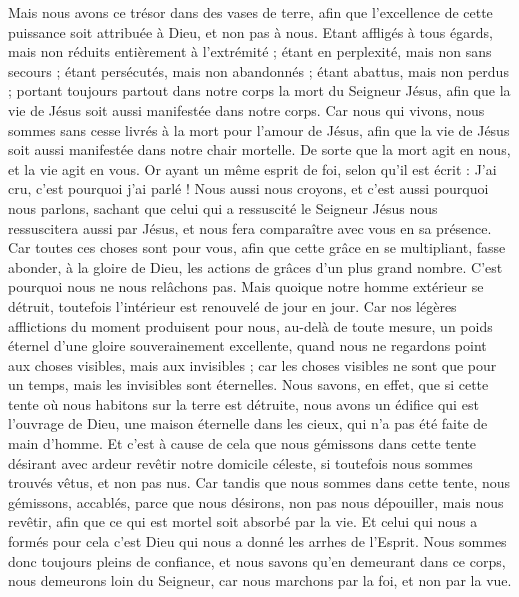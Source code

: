 \begin{multicols}{2}
Mais nous avons ce trésor dans des vases de terre, afin que l'excellence de cette puissance soit attribuée à Dieu, et non pas à nous.
Etant affligés à tous égards, mais non réduits entièrement à l’extrémité ; étant en perplexité, mais non sans secours ;
étant persécutés, mais non abandonnés ; étant abattus, mais non perdus ;
portant toujours partout dans notre corps la mort du Seigneur Jésus, afin que la vie de Jésus soit aussi manifestée dans notre corps.
Car nous qui vivons, nous sommes sans cesse livrés à la mort pour l'amour de Jésus, afin que la vie de Jésus soit aussi manifestée dans notre chair mortelle.
De sorte que la mort agit en nous, et la vie agit en vous.
Or ayant un même esprit de foi, selon qu'il est écrit : J'ai cru, c'est pourquoi j'ai parlé ! Nous aussi nous croyons, et c'est aussi pourquoi nous parlons,
sachant que celui qui a ressuscité le Seigneur Jésus nous ressuscitera aussi par Jésus, et nous fera comparaître avec vous en sa présence.
Car toutes ces choses sont pour vous, afin que cette grâce en se multipliant, fasse abonder, à la gloire de Dieu, les actions de grâces d’un plus grand nombre.
C'est pourquoi nous ne nous relâchons pas. Mais quoique notre homme extérieur se détruit, toutefois l'intérieur est renouvelé de jour en jour.
Car nos légères afflictions du moment produisent pour nous, au-delà de toute mesure, un poids éternel d'une gloire souverainement excellente,
quand nous ne regardons point aux choses visibles, mais aux invisibles ; car les choses visibles ne sont que pour un temps, mais les invisibles sont éternelles.
\VerseOne{}Nous savons, en effet, que si cette tente où nous habitons sur la terre est détruite, nous avons un édifice qui est l’ouvrage de Dieu, une maison éternelle dans les cieux, qui n’a pas été faite de main d’homme.
Et c'est à cause de cela que nous gémissons dans cette tente désirant avec ardeur revêtir notre domicile céleste,
si toutefois nous sommes trouvés vêtus, et non pas nus.
Car tandis que nous sommes dans cette tente, nous gémissons, accablés, parce que nous désirons, non pas nous dépouiller, mais nous revêtir, afin que ce qui est mortel soit absorbé par la vie.
Et celui qui nous a formés pour cela c'est Dieu qui nous a donné les arrhes de l'Esprit.
Nous sommes donc toujours pleins de confiance, et nous savons qu’en demeurant dans ce corps, nous demeurons loin du Seigneur,
car nous marchons par la foi, et non par la vue.

\end{multicols}
